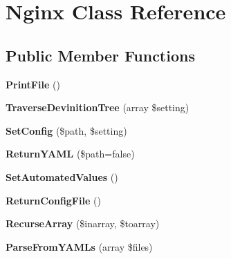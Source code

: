 \hypertarget{class_applications_1_1_nginx}{
\section{\-Nginx \-Class \-Reference}
\label{class_applications_1_1_nginx}
}
\subsection*{\-Public \-Member \-Functions}
\begin{DoxyCompactItemize}
\item 
\hypertarget{class_applications_1_1_nginx_ac3923299524e255b8521ded92641c86d}{
{\bfseries \-Print\-File} ()}
\label{class_applications_1_1_nginx_ac3923299524e255b8521ded92641c86d}

\item 
\hypertarget{class_applications_1_1_nginx_a8b1566e34f2bdd7ed846e95efce30988}{
{\bfseries \-Traverse\-Devinition\-Tree} (array \$setting)}
\label{class_applications_1_1_nginx_a8b1566e34f2bdd7ed846e95efce30988}

\item 
\hypertarget{class_applications_1_1_nginx_a20bfe27bcc1ff6915c5e6f4132910f6e}{
{\bfseries \-Set\-Config} (\$path, \$setting)}
\label{class_applications_1_1_nginx_a20bfe27bcc1ff6915c5e6f4132910f6e}

\item 
\hypertarget{class_applications_1_1_nginx_a5ab4c44d6595dd1869afcabdac452e3c}{
{\bfseries \-Return\-Y\-A\-M\-L} (\$path=false)}
\label{class_applications_1_1_nginx_a5ab4c44d6595dd1869afcabdac452e3c}

\item 
\hypertarget{class_applications_1_1_nginx_a4bd7044da8c7a4d8e67f702595919280}{
{\bfseries \-Set\-Automated\-Values} ()}
\label{class_applications_1_1_nginx_a4bd7044da8c7a4d8e67f702595919280}

\item 
\hypertarget{class_applications_1_1_nginx_a5b375992c9f5c18385dcfebb7812eccd}{
{\bfseries \-Return\-Config\-File} ()}
\label{class_applications_1_1_nginx_a5b375992c9f5c18385dcfebb7812eccd}

\item 
\hypertarget{class_applications_1_1_nginx_ab7aad08dd60cd83cbc0a55d9ee7c27c9}{
{\bfseries \-Recurse\-Array} (\$inarray, \$toarray)}
\label{class_applications_1_1_nginx_ab7aad08dd60cd83cbc0a55d9ee7c27c9}

\item 
\hypertarget{class_applications_1_1_nginx_a4eabb77f1e531d029ee6215acfb2140d}{
{\bfseries \-Parse\-From\-Y\-A\-M\-Ls} (array \$files)}
\label{class_applications_1_1_nginx_a4eabb77f1e531d029ee6215acfb2140d}

\end{DoxyCompactItemize}

